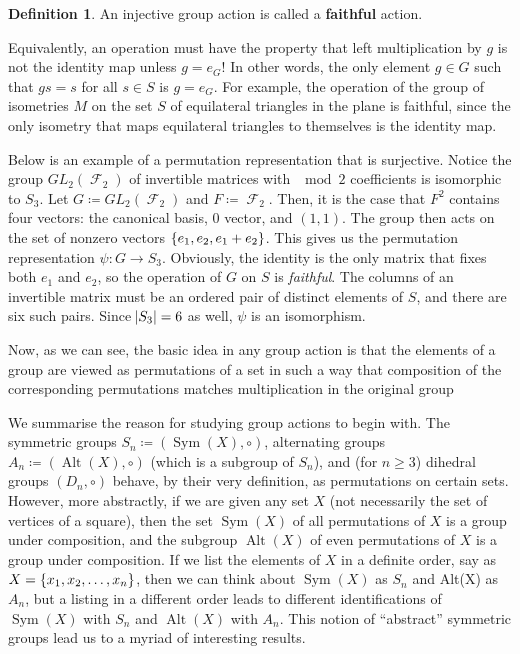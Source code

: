 \documentclass[11pt]{amsart} %
\theoremstyle{definition}
\newtheorem{definition}{Definition}[section]
\theoremstyle{definition}
\DeclareMathOperator{\FF}{\mathcal{F}}
\DeclareMathOperator{\sym}{Sym}
\DeclareMathOperator{\alt}{Alt}
\numberwithin{equation}{section}
\begin{document}
\begin{definition}
	An injective group action is called a \textbf{faithful} action.
\end{definition}
Equivalently, an operation must have the property that left multiplication by $g$ is not the identity map unless $g=e_G$! In other words, the only element $g \in G$ such that $gs = s$ for all $s \in S$ is $g=e_G$. For example, the operation of the group of isometries $M$ on the set $S$ of equilateral triangles in the plane is faithful, since the only isometry that maps equilateral triangles to themselves is the identity map.

Below is an example of a permutation representation that is surjective. Notice the group $GL_2 (\FF_2)$ of invertible matrices with $\mod 2$ coefficients is isomorphic to $S_3$. Let $G \coloneqq GL_2 (\FF_2)$ and $F \coloneqq \FF_2$. Then, it is the case that $F^2 $ contains four vectors: the canonical basis, $0$ vector, and $(1,1)$. The group then acts on the set of nonzero vectors $\set{e_1,e_2,e_1+e_2}$. This gives us the permutation representation $\psi : G \to S_3$. Obviously, the identity is the only matrix that fixes both $e_1$ and $e_2$, so the operation of $G$ on $S$ is \textit{faithful}. The columns of an invertible matrix must be an ordered pair of distinct elements of $S$, and there are six such pairs. Since $\abs{S_3} = 6$ as well, $\psi$ is an isomorphism.

Now, as we can see, the basic idea in any group action is that the elements of a group are viewed as permutations of a set in such a way that composition of the corresponding permutations matches multiplication in the original group

We summarise the reason for studying group actions to begin with. The symmetric groups $S_n \coloneqq (\sym(X),\circ)$, alternating groups $A_n \coloneqq (\alt(X),\circ) $ (which is a subgroup of $ S_n $), and (for $n \geq 3$) dihedral groups $(D_n,\circ)$ behave, by their very definition, as permutations on certain sets. However, more abstractly, if we are given any set $X$ (not necessarily the set of vertices of a square), then the set $\sym(X)$ of all permutations of $X$ is a group under composition, and the subgroup $\alt(X)$ of even permutations of $X$ is a group under composition. If we list the elements of $X$ in a definite order, say as $X = \set{x_1,x_2,\dots,x_n}$, then we can think about $\sym(X)$ as $S_n$ and Alt(X) as $A_n$, but a listing in a different order leads to different identifications of $\sym(X)$ with $S_n$ and $\alt(X)$ with $A_n$. This notion of ``abstract'' symmetric groups lead us to a myriad of interesting results.
\end{document}
